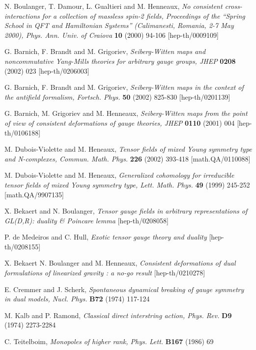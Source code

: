 \documentclass[a4paper,12pt]{article}
\begin{document}
\begin{thebibliography}{99}
  N. Boulanger, T. Damour, L. Gualtieri and M. Henneaux, 
\textit{No consistent cross-interactions for a collection of massless spin-2
fields, Proceedings of the ``Spring School in QFT and Hamiltonian Systems''
(Calimanesti, Romania, 2-7 May 2000), Phys. Ann. Univ. of Craiova} \textbf{10%
} (2000) 94-106 [hep-th/0009109]

  G. Barnich, F. Brandt and M. Grigoriev, \textit{%
Seiberg-Witten maps and noncommutative Yang-Mills theories for arbitrary
gauge groups, JHEP} \textbf{0208} (2002) 023 [hep-th/0206003]

  G. Barnich, F. Brandt and M. Grigoriev, \textit{%
Seiberg-Witten maps in the context of the antifield formalism, Fortsch. Phys.%
} \textbf{50} (2002) 825-830 [hep-th/0201139]

  G. Barnich, M. Grigoriev and M. Henneaux, \textit{%
Seiberg-Witten maps from the point of view of consistent deformations of
gauge theories, JHEP} \textbf{0110} (2001) 004 [hep-th/0106188]

  M. Dubois-Violette and M. Heneaux, \textit{Tensor fields
of mixed Young symmetry type and N-complexes, Commun. Math. Phys.} \textbf{%
226} (2002) 393-418 [math.QA/0110088]

  M. Dubois-Violette and M. Heneaux, \textit{Generalized
cohomology for irreducible tensor fields of mixed Young symmetry type, Lett.
Math. Phys.} \textbf{49} (1999) 245-252 [math.QA/9907135]

  X. Bekaert and N. Boulanger, \textit{Tensor gauge fields
in arbitrary representations of GL(D,R): duality \& Poincare lemma}
[hep-th/0208058]

  P. de Medeiros and C. Hull, \textit{Exotic tensor gauge
theory and duality} [hep-th/0208155]

  X. Bekaert N. Boulanger and M. Henneaux, \textit{%
Consistent deformations of dual formulations of linearized gravity : a no-go
result} [hep-th/0210278]

  E. Cremmer and J. Scherk, \textit{Spontaneous dynamical
breaking of gauge symmetry in dual models, Nucl. Phys.} \textbf{B72} (1974)
117-124

  M. Kalb and P. Ramond, \textit{Classical direct
interstring action, Phys. Rev.} \textbf{D9} (1974) 2273-2284

  C. Teitelboim, \textit{Monopoles of higher rank, Phys.
Lett.} \textbf{B167} (1986) 69


\end{thebibliography}
\end{document}
